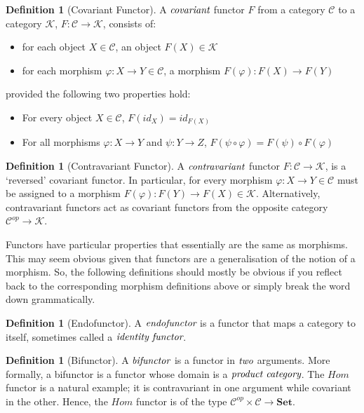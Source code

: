 \documentclass[10pt, oneside, reqno]{amsart}
\theoremstyle{plain}%
\theoremstyle{definition}
\newtheorem{defn}[thm]{Definition}
\theoremstyle{remark}
\newcommand{\Id}{\mathit{id}_}
\begin{document}
\begin{defn}[Covariant Functor]
 A $\emph{covariant}$ functor $F$ from a category $\mathcal{C}$ to a category $\mathcal{K}$, $F: \mathcal{C} \to \mathcal{K}$, consists of:
 \begin{itemize}
  \item for each object $X \in \mathcal{C}$, an object $F(X) \in \mathcal{K}$
  \item for each morphism $\varphi: X \to Y \in \mathcal{C}$, a morphism $F(\varphi): F(X) \to F(Y)$
 \end{itemize}
 provided the following two properties hold:
 \begin{itemize}
  \item For every object $X \in \mathcal{C}$, $F(\Id{X}) = \Id{F(X)}$
  \item For all morphisms $\varphi: X \to Y$ and $\psi: Y \to Z$, $F(\psi \circ \varphi) = F(\psi) \circ F(\varphi)$
 \end{itemize}
\end{defn}

\begin{defn}[Contravariant Functor]
 A $\emph{contravariant}$ functor $F: \mathcal{C} \to \mathcal{K}$, is a `reversed' covariant functor.
 In particular, for every morphism $\varphi: X \to Y \in \mathcal{C}$ must be assigned to a morphism $F(\varphi): F(Y) \to F(X) \in \mathcal{K}$.
 Alternatively, contravariant functors act as covariant functors from the opposite category $\mathcal{C}^{op} \to \mathcal{K}$.
\end{defn}

Functors have particular properties that essentially are the same as morphisms.
This may seem obvious given that functors are a generalisation of the notion of a morphism.
So, the following definitions should mostly be obvious if you reflect back to the corresponding morphism
definitions above or simply break the word down grammatically.

\begin{defn}[Endofunctor]
 A $\emph{endofunctor}$ is a functor that maps a category to itself, sometimes called a $\emph{identity functor}$.
\end{defn}

\begin{defn}[Bifunctor]
 A $\emph{bifunctor}$ is a functor in $\emph{two}$ arguments. More formally, a bifunctor is a functor whose
 domain is a $\emph{product category}$.
 The $Hom$ functor is a natural example; it is contravariant in one argument while covariant in the other.
 Hence, the $Hom$ functor is of the type $\mathcal{C}^{op} \times \mathcal{C} \to \textbf{Set}$.
\end{defn}
\end{document}
